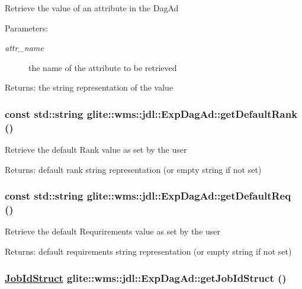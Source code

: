 Retrieve the value of an attribute in the Dag\-Ad \begin{Desc}
\item[Parameters:]
\begin{description}
\item[{\em attr\_\-name}]the name of the attribute to be retrieved \end{description}
\end{Desc}
\begin{Desc}
\item[Returns:]the string representation of the value \end{Desc}
\hypertarget{classglite_1_1wms_1_1jdl_1_1ExpDagAd_a22}{
\subsubsection[getDefaultRank]{\setlength{\rightskip}{0pt plus 5cm}const std::string glite::wms::jdl::Exp\-Dag\-Ad::get\-Default\-Rank ()}}
\label{classglite_1_1wms_1_1jdl_1_1ExpDagAd_a22}


Retrieve the default Rank value as set by the user \begin{Desc}
\item[Returns:]default rank string representation (or empty string if not set) \end{Desc}
\hypertarget{classglite_1_1wms_1_1jdl_1_1ExpDagAd_a23}{
\subsubsection[getDefaultReq]{\setlength{\rightskip}{0pt plus 5cm}const std::string glite::wms::jdl::Exp\-Dag\-Ad::get\-Default\-Req ()}}
\label{classglite_1_1wms_1_1jdl_1_1ExpDagAd_a23}


Retrieve the default Requrirements value as set by the user \begin{Desc}
\item[Returns:]default requirements string representation (or empty string if not set) \end{Desc}
\hypertarget{classglite_1_1wms_1_1jdl_1_1ExpDagAd_a13}{
\subsubsection[getJobIdStruct]{\setlength{\rightskip}{0pt plus 5cm}\hyperlink{structglite_1_1wms_1_1jdl_1_1JobIdStruct}{Job\-Id\-Struct} glite::wms::jdl::Exp\-Dag\-Ad::get\-Job\-Id\-Struct ()}}
\label{classglite_1_1wms_1_1jdl_1_1ExpDagAd_a13}


